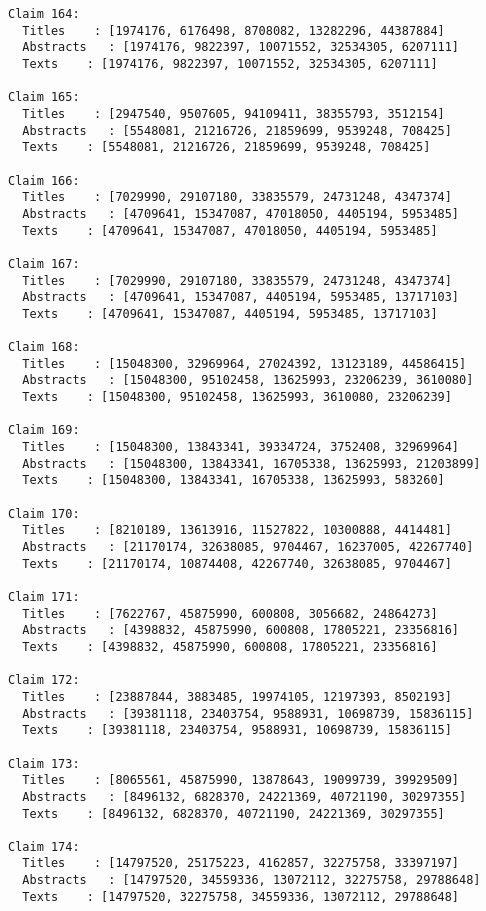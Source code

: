 \documentclass[11pt]{article}
\begin{document}
\begin{Verbatim}[commandchars=\\\{\}]
Claim 164:
  Titles    : [1974176, 6176498, 8708082, 13282296, 44387884]
  Abstracts   : [1974176, 9822397, 10071552, 32534305, 6207111]
  Texts    : [1974176, 9822397, 10071552, 32534305, 6207111]

Claim 165:
  Titles    : [2947540, 9507605, 94109411, 38355793, 3512154]
  Abstracts   : [5548081, 21216726, 21859699, 9539248, 708425]
  Texts    : [5548081, 21216726, 21859699, 9539248, 708425]

Claim 166:
  Titles    : [7029990, 29107180, 33835579, 24731248, 4347374]
  Abstracts   : [4709641, 15347087, 47018050, 4405194, 5953485]
  Texts    : [4709641, 15347087, 47018050, 4405194, 5953485]

Claim 167:
  Titles    : [7029990, 29107180, 33835579, 24731248, 4347374]
  Abstracts   : [4709641, 15347087, 4405194, 5953485, 13717103]
  Texts    : [4709641, 15347087, 4405194, 5953485, 13717103]

Claim 168:
  Titles    : [15048300, 32969964, 27024392, 13123189, 44586415]
  Abstracts   : [15048300, 95102458, 13625993, 23206239, 3610080]
  Texts    : [15048300, 95102458, 13625993, 3610080, 23206239]

Claim 169:
  Titles    : [15048300, 13843341, 39334724, 3752408, 32969964]
  Abstracts   : [15048300, 13843341, 16705338, 13625993, 21203899]
  Texts    : [15048300, 13843341, 16705338, 13625993, 583260]

Claim 170:
  Titles    : [8210189, 13613916, 11527822, 10300888, 4414481]
  Abstracts   : [21170174, 32638085, 9704467, 16237005, 42267740]
  Texts    : [21170174, 10874408, 42267740, 32638085, 9704467]

Claim 171:
  Titles    : [7622767, 45875990, 600808, 3056682, 24864273]
  Abstracts   : [4398832, 45875990, 600808, 17805221, 23356816]
  Texts    : [4398832, 45875990, 600808, 17805221, 23356816]

Claim 172:
  Titles    : [23887844, 3883485, 19974105, 12197393, 8502193]
  Abstracts   : [39381118, 23403754, 9588931, 10698739, 15836115]
  Texts    : [39381118, 23403754, 9588931, 10698739, 15836115]

Claim 173:
  Titles    : [8065561, 45875990, 13878643, 19099739, 39929509]
  Abstracts   : [8496132, 6828370, 24221369, 40721190, 30297355]
  Texts    : [8496132, 6828370, 40721190, 24221369, 30297355]

Claim 174:
  Titles    : [14797520, 25175223, 4162857, 32275758, 33397197]
  Abstracts   : [14797520, 34559336, 13072112, 32275758, 29788648]
  Texts    : [14797520, 32275758, 34559336, 13072112, 29788648]


\end{Verbatim}
\end{document}
